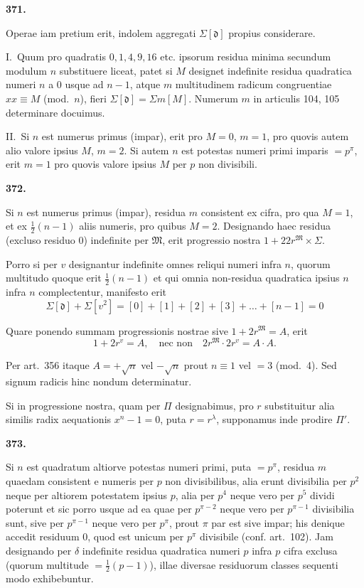 \documentclass[10pt,a4paper]{article}
\begin{document}
\medskip

\textbf{371.}

Operae iam pretium erit, indolem aggregati $\Sigma[\mathfrak{d}]$ propius considerare.

I.~Quum pro quadratis $0, 1, 4, 9, 16$ etc. ipsorum residua minima secundum modulum $n$ substituere liceat, patet si $M$ designet indefinite residua quadratica numeri $n$ a $0$ usque ad $n-1$, atque $m$ multitudinem radicum congruentiae $xx \equiv M$ (mod.~$n$), fieri $\Sigma[\mathfrak{d}] = \Sigma m[M]$. Numerum $m$ in articulis 104, 105 determinare docuimus.

II.~Si $n$ est numerus primus (impar), erit pro $M = 0$, $m = 1$, pro quovis autem alio valore ipsius $M$, $m = 2$. Si autem $n$ est potestas numeri primi imparis $= p^\pi$, erit $m = 1$ pro quovis valore ipsius $M$ per $p$ non divisibili.

\newpage

\textbf{372.}

Si $n$ est numerus primus (impar), residua $m$ consistent ex cifra, pro qua $M = 1$, et ex $\frac{1}{2}(n-1)$ aliis numeris, pro quibus $M = 2$. Designando haec residua (excluso residuo 0) indefinite per $\mathfrak{M}$, erit progressio nostra $1 + 22r^{\mathfrak{M}} \times \Sigma$.

Porro si per $v$ designantur indefinite omnes reliqui numeri infra $n$, quorum multitudo quoque erit $\frac{1}{2}(n-1)$ et qui omnia non-residua quadratica ipsius $n$ infra $n$ complectentur, manifesto erit
\[
\Sigma[\mathfrak{d}] + \Sigma[v^2] = [0] + [1] + [2] + [3] + \ldots + [n-1] = 0
\]

Quare ponendo summam progressionis nostrae sive $1 + 2r^{\mathfrak{M}} = A$, erit
\[
1 + 2r^{v} = A, \quad \text{nec non} \quad 2r^{\mathfrak{M}} \cdot 2r^{v} = A \cdot A.
\]

Per art.~356 itaque $A = +\sqrt{n}$ vel $-\sqrt{n}$ prout $n \equiv 1$ vel $= 3$ (mod.~4). Sed signum radicis hinc nondum determinatur.

Si in progressione nostra, quam per $\Pi$ designabimus, pro $r$ substituitur alia similis radix aequationis $x^n - 1 = 0$, puta $r = r^\lambda$, supponamus inde prodire $\Pi'$.

\medskip

\textbf{373.}

Si $n$ est quadratum altiorve potestas numeri primi, puta $= p^\pi$, residua $m$ quaedam consistent e numeris per $p$ non divisibilibus, alia erunt divisibilia per $p^2$ neque per altiorem potestatem ipsius $p$, alia per $p^4$ neque vero per $p^5$ dividi poterunt et sic porro usque ad ea quae per $p^{\pi-2}$ neque vero per $p^{\pi-1}$ divisibilia sunt, sive per $p^{\pi-1}$ neque vero per $p^\pi$, prout $\pi$ par est sive impar; his denique accedit residuum 0, quod est unicum per $p^\pi$ divisibile (conf. art.~102). Jam designando per $\delta$ indefinite residua quadratica numeri $p$ infra $p$ cifra exclusa (quorum multitude $= \frac{1}{2}(p-1)$), illae diversae residuorum classes sequenti modo exhibebuntur.
\end{document}
